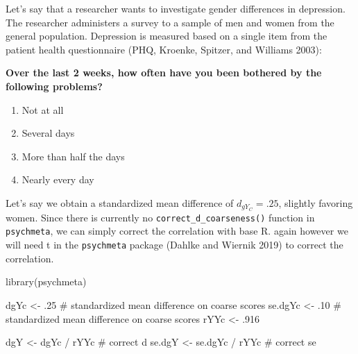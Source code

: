 \documentclass[
  letterpaper,
  DIV=11,
  numbers=noendperiod]{scrreprt}
\newenvironment{Shaded}{}{}
\newcommand{\CommentTok}[1]{\textcolor[rgb]{0.54,0.53,0.53}{#1}}
\newcommand{\DecValTok}[1]{\textcolor[rgb]{0.69,0.50,0.00}{#1}}
\newcommand{\FunctionTok}[1]{\textcolor[rgb]{0.39,0.29,0.61}{#1}}
\newcommand{\NormalTok}[1]{\textcolor[rgb]{0.12,0.11,0.11}{#1}}
\newcommand{\OtherTok}[1]{\textcolor[rgb]{0.00,0.43,0.16}{#1}}
\newcommand{\SpecialCharTok}[1]{\textcolor[rgb]{0.24,0.68,0.91}{#1}}
\providecommand{\tightlist}{%
  \setlength{\itemsep}{0pt}\setlength{\parskip}{0pt}}\usepackage{longtable,booktabs,array}
\begin{document}
\begin{tcolorbox}[enhanced jigsaw, toptitle=1mm, titlerule=0mm, arc=.35mm, breakable, colframe=quarto-callout-note-color-frame, title={Applied Example in R}, opacitybacktitle=0.6, opacityback=0, colbacktitle=quarto-callout-note-color!10!white, coltitle=black, bottomtitle=1mm, colback=white, bottomrule=.15mm, rightrule=.15mm, toprule=.15mm, leftrule=.75mm, left=2mm]

Let's say that a researcher wants to investigate gender differences in
depression. The researcher administers a survey to a sample of men and
women from the general population. Depression is measured based on a
single item from the patient health questionnaire (PHQ, Kroenke,
Spitzer, and Williams 2003):

\textbf{Over the last 2 weeks, how often have you been bothered by the
following problems?}

\begin{enumerate}
\def\labelenumi{\arabic{enumi}.}
\tightlist
\item
  Not at all
\item
  Several days
\item
  More than half the days
\item
  Nearly every day
\end{enumerate}

Let's say we obtain a standardized mean difference of \(d_{g Y_C}=.25\),
slightly favoring women. Since there is currently no
\texttt{correct\_d\_coarseness()} function in \texttt{psychmeta}, we can
simply correct the correlation with base R. again however we will need t
in the \texttt{psychmeta} package (Dahlke and Wiernik 2019) to correct
the correlation.

\begin{Shaded}
\begin{Highlighting}[]
\FunctionTok{library}\NormalTok{(psychmeta)}

\NormalTok{dgYc }\OtherTok{\textless{}{-}}\NormalTok{ .}\DecValTok{25} \CommentTok{\# standardized mean difference on coarse scores}
\NormalTok{se.dgYc }\OtherTok{\textless{}{-}}\NormalTok{ .}\DecValTok{10} \CommentTok{\# standardized mean difference on coarse scores}
\NormalTok{rYYc }\OtherTok{\textless{}{-}}\NormalTok{ .}\DecValTok{916}

\NormalTok{dgY }\OtherTok{\textless{}{-}}\NormalTok{ dgYc }\SpecialCharTok{/}\NormalTok{ rYYc }\CommentTok{\# correct d}
\NormalTok{se.dgY }\OtherTok{\textless{}{-}}\NormalTok{ se.dgYc }\SpecialCharTok{/}\NormalTok{ rYYc }\CommentTok{\# correct se}


\end{Highlighting}
\end{Shaded}
\end{tcolorbox}
\end{document}
